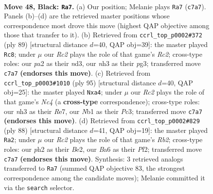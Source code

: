 \documentclass[11pt]{article}
\begin{document}
\clearpage

\begin{figure}[p]\centering
\begin{subfigure}{0.46\textwidth}\centering
\resizebox{\linewidth}{!}{%
\newchessgame
\chessboard[
  setfen={6k1/2r2p1p/b5p1/4Pp2/5P2/1B5N/P4KPP/1n6 b - - 5 48},
  showmover=false,
  pgfstyle=straightmove, color=movearrow, markmove={c7-a7}
]}
\caption{}
\end{subfigure}\hfill
\begin{subfigure}{0.46\textwidth}\centering
\resizebox{\linewidth}{!}{%
\newchessgame
\chessboard[
  setfen={8/2r2pk1/5pp1/b2B4/8/3N2Pp/1B3P1P/5K2 b - - 6 45},
  showmover=false,
  pgfstyle=straightmove, color=movearrow, markmove={c7-c8}
]}
\caption{}
\end{subfigure}
\\[4pt]
\begin{subfigure}{0.46\textwidth}\centering
\resizebox{\linewidth}{!}{%
\newchessgame
\chessboard[
  setfen={6k1/4r1p1/4p3/2n1P3/PpB2P2/2p4P/P4KP1/3R4 b - - 0 48},
  showmover=false,
  pgfstyle=straightmove, color=movearrow, markmove={c5-a4}
]}
\caption{}
\end{subfigure}\hfill
\begin{subfigure}{0.46\textwidth}\centering
\resizebox{\linewidth}{!}{%
\newchessgame
\chessboard[
  setfen={2r2k2/3n1pp1/3bp1p1/8/4P2P/4B1P1/1R2BPK1/8 w - - 7 45},
  showmover=false,
  pgfstyle=straightmove, color=movearrow, markmove={b2-a2}
]}
\caption{}
\end{subfigure}
\caption{\textbf{Move 48, Black: \texttt{Ra7}.} (a) Our position; Melanie plays \texttt{Ra7} (\texttt{c7a7}). Panels (b)--(d) are the retrieved master positions whose correspondence most drove this move (highest QAP objective among those that transfer to it). (b) Retrieved from \texttt{ccrl\_top\_p0002\#372} (ply 89) [structural distance $d$=40, QAP obj=39]: the master played \texttt{Rc8}; under $\mu$ our \emph{Rc2} plays the role of that game's \emph{Rc2}; cross-type roles: our \emph{p}a2 as their \emph{n}d3, our \emph{n}h3 as their \emph{p}g3; transferred move \texttt{c7a7} \textbf{(endorses this move)}. (c) Retrieved from \texttt{ccrl\_top\_p0003\#1010} (ply 95) [structural distance $d$=40, QAP obj=25]: the master played \texttt{Nxa4}; under $\mu$ our \emph{Rc2} plays the role of that game's \emph{Nc4} (a \textbf{cross-type} correspondence); cross-type roles: our \emph{n}h3 as their \emph{R}e7, our \emph{N}b1 as their \emph{P}c3; transferred move \texttt{c7a7} \textbf{(endorses this move)}. (d) Retrieved from \texttt{ccrl\_top\_p0002\#829} (ply 88) [structural distance $d$=41, QAP obj=19]: the master played \texttt{Ra2}; under $\mu$ our \emph{Rc2} plays the role of that game's \emph{Rb2}; cross-type roles: our \emph{p}h2 as their \emph{B}e2, our \emph{B}a6 as their \emph{P}f2; transferred move \texttt{c7a7} \textbf{(endorses this move)}. Synthesis: 3 retrieved analogs transferred to \texttt{Ra7} (summed QAP objective 83, the strongest correspondence among the candidate moves); Melanie committed it via the \texttt{search} selector.}
\label{fig:thought-m95}
\end{figure}
\end{document}
